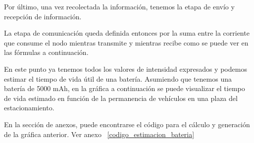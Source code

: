 Por último, una vez recolectada la información, tenemos la etapa de envío y recepción de información.



La etapa de comunicación queda definida entonces por la suma entre la corriente que
consume el nodo mientras transmite y mientras recibe como se puede ver en las fórmulas
a continuación.




En este punto ya tenemos todos los valores de intensidad expresados y podemos estimar el
tiempo de vida útil de una batería. Asumiendo que tenemos una batería de 5000 mAh, en la
gráfica a continuación se puede visualizar el tiempo de vida estimado en función de la
permanencia de vehículos en una plaza del estacionamiento.


En la sección de anexos, puede encontrarse el código para el cálculo y generación de la
gráfica anterior. Ver anexo ~\ref{codigo_estimacion_bateria}
